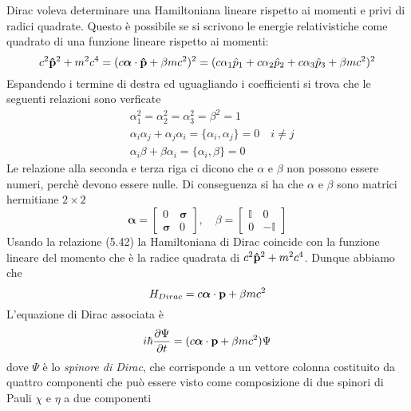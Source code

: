 Dirac voleva determinare una Hamiltoniana lineare rispetto ai momenti e privi di radici quadrate. Questo \`e possibile se si scrivono le energie relativistiche come quadrato di una funzione lineare rispetto ai momenti:
\begin{equation}
	c^2 \bold{\hat{p}}^2 + m^2 c^4 = (c \boldsymbol{\alpha} \cdot \bold{\hat{p}} + \beta mc^2)^2 = (c \alpha_1 \hat{p}_1 + c \alpha_2 \hat{p}_2 + c \alpha_3 \hat{p}_3 + \beta mc^2)^2
\end{equation} 
\newpage
Espandendo i termine di destra ed uguagliando i coefficienti si trova che le seguenti relazioni sono verficate
\begin{align*}
	& \alpha_1^2 = \alpha_2^2 = \alpha_3^2 = \beta^2 = 1 \\[0.1cm]
	& \alpha_i\alpha_j + \alpha_j\alpha_i = \{ \alpha_i , \alpha_j \} = 0 \quad i \neq j  \\[0.1cm]
	& \alpha_i \beta + \beta \alpha_i = \{\alpha_i,\beta\} = 0
\end{align*}
Le relazione alla seconda e terza riga ci dicono che $\alpha$ e $\beta$ non possono essere numeri, perch\`e devono essere nulle. Di conseguenza si ha che $\alpha$ e $\beta$ sono matrici hermitiane $2 \times 2$
\begin{equation*}
	\boldsymbol{\alpha} = \left [ \begin{array}{cc}
		0 & \boldsymbol{\sigma} \\ \boldsymbol{\sigma} & 0
	\end{array} \right]  
	,\quad 
	\beta =  \left [ \begin{array}{cc}
		\mathbb{I} & 0 \\ 0 & -\mathbb{I}
	\end{array} \right]  
\end{equation*}
Usando la relazione (5.42) la Hamiltoniana di Dirac coincide con la funzione lineare del momento che \`e la radice quadrata di $c^2 \bold{\hat{p}}^2 + m^2 c^4$. Dunque abbiamo che
\begin{equation*}
	H_{Dirac} = c \boldsymbol{\alpha} \cdot \bold{p} + \beta m c^2
\end{equation*}
L'equazione di Dirac associata \`e 
\begin{equation*}
	i \hbar \frac{\partial \Psi}{\partial t} = (c \boldsymbol{\alpha} \cdot \bold{p} + \beta m c^2) \Psi
\end{equation*}
dove $\Psi$ \`e lo \textit{spinore di Dirac}, che corrisponde a un vettore colonna costituito da quattro componenti che pu\`o essere visto come composizione di due spinori di Pauli $\chi$ e $\eta$ a due componenti

